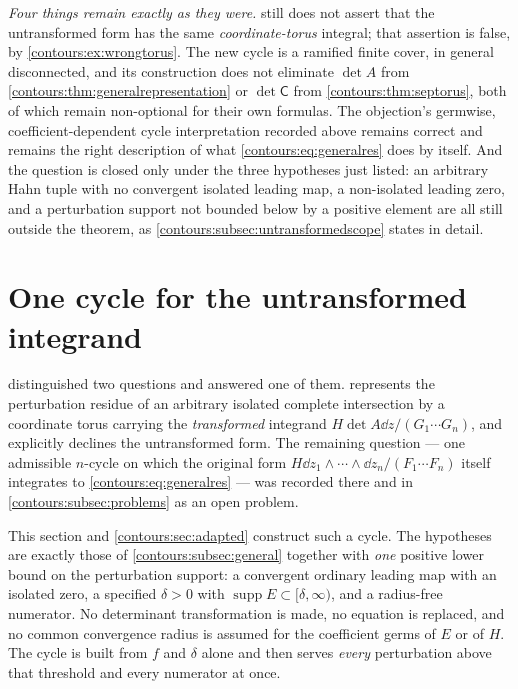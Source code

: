 \documentclass[11pt,letterpaper]{article}
\theoremstyle{definition}
\theoremstyle{remark}
\newcommand{\supp}{\operatorname{supp}}\newcommand{\Res}{\operatorname{Res}}
\numberwithin{equation}{section}
\begin{document}
\emph{Four things remain exactly as they were.}
 still does not assert that the
untransformed form has the same \emph{coordinate-torus} integral; that assertion
is false, by \cref{contours:ex:wrongtorus}. The new cycle is a ramified finite
cover, in general disconnected, and its construction does not eliminate
$\det A$ from \cref{contours:thm:generalrepresentation} or $\det\mathsf C$ from
\cref{contours:thm:septorus}, both of which remain non-optional for their own
formulas. The objection's germwise, coefficient-dependent cycle interpretation
recorded above remains correct and remains the right description of what
\eqref{contours:eq:generalres} does by itself. And the question is closed only
under the three hypotheses just listed: an arbitrary Hahn tuple with no
convergent isolated leading map, a non-isolated leading zero, and a perturbation
support not bounded below by a positive element are all still outside the
theorem, as \cref{contours:subsec:untransformedscope} states in detail.


\section{One cycle for the untransformed integrand}
\label{contours:sec:untransformed}

 distinguished two questions and answered one of
them.  represents the perturbation
residue of an arbitrary isolated complete intersection by a coordinate torus
carrying the \emph{transformed} integrand $H\det A\dd z/(G_1\cdots G_n)$, and
explicitly declines the untransformed form. The remaining question --- one
admissible $n$-cycle on which the original form
$H\dd z_1\wedge\cdots\wedge \dd z_n/(F_1\cdots F_n)$ itself integrates to
\eqref{contours:eq:generalres} --- was recorded there and in
\cref{contours:subsec:problems} as an open problem.

This section and \cref{contours:sec:adapted} construct such a cycle. The
hypotheses are exactly those of \cref{contours:subsec:general} together with
\emph{one} positive lower bound on the perturbation support: a convergent
ordinary leading map with an isolated zero, a specified $\delta>0$ with
$\supp E\subset[\delta,\infty)$, and a radius-free numerator. No determinant
transformation is made, no equation is replaced, and no common convergence
radius is assumed for the coefficient germs of $E$ or of $H$. The cycle is
built from $f$ and $\delta$ alone and then serves \emph{every} perturbation
above that threshold and every numerator at once.
\end{document}
